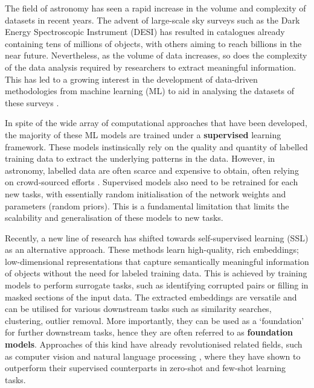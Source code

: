 \documentclass[a4paper,12pt]{article}
\begin{document}
The field of astronomy has seen a rapid increase in the volume and complexity of datasets in recent years. The advent of large-scale sky surveys such as the Dark Energy Spectroscopic Instrument (DESI) \cite{DESI} has resulted in catalogues already containing tens of millions of objects, with others aiming to reach billions in the near future. Nevertheless, as the volume of data increases, so does the complexity of the data analysis required by researchers to extract meaningful information. This has led to a growing interest in the development of data-driven methodologies from machine learning (ML) to aid in analysing the datasets of these surveys \cite{ivezic2020statistics}. 

In spite of the wide array of computational approaches that have been developed, the majority of these ML models are trained under a \textbf{supervised} learning framework. These models instinsically rely on the quality and quantity of labelled training data to extract the underlying patterns in the data. However, in astronomy, labelled data are often scarce and expensive to obtain, often relying on crowd-sourced efforts \cite{willett2013galaxy}. Supervised models also need to be retrained for each new tasks, with essentially random initialisation of the network weights and parameters (random priors). This is a fundamental limitation that limits the scalability and generalisation of these models to new tasks.

Recently, a new line of research has shifted towards self-supervised learning (SSL) as an alternative approach. These methods learn high-quality, rich embeddings; low-dimensional representations that capture semantically meaningful information of objects without the need for labeled training data. This is achieved by training models to perform surrogate tasks, such as identifying corrupted pairs or filling in masked sections of the input data. The extracted embeddings are versatile and can be utilised for various downstream tasks such as similarity searches, clustering, outlier removal. More importantly, they can be used as a `foundation' for further downstream tasks, hence they are often referred to as \textbf{foundation models}.  Approaches of this kind have already revolutionised related fields, such as computer vision \cite{he2021maskedautoencodersscalablevision} and natural language processing \cite{radford2019language}, where they have shown to outperform their supervised counterparts in zero-shot and few-shot learning tasks.
\end{document}
